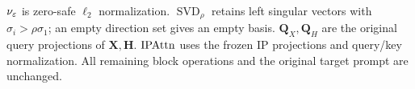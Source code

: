 \vspace{-5pt}
{\small $\nu_{\varepsilon}$ is zero-safe $\ell_2$ normalization. $\operatorname{SVD}_{\rho}$ retains left singular
vectors with $\sigma_i>\rho\sigma_1$; an empty direction set gives an empty basis.
$\mathbf Q_X,\mathbf Q_H$ are the original query projections of $\mathbf X,\mathbf H$.
$\operatorname{IPAttn}$ uses the frozen IP projections and query/key normalization.
All remaining block operations and the original target prompt are unchanged.}
